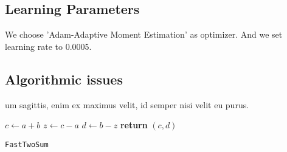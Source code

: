 \documentclass{article}
\begin{document}
\subsection{Learning Parameters}
 We  choose 'Adam-Adaptive Moment Estimation' as optimizer. And we set learning rate to 0.0005.
 
 


	

\subsection{Algorithmic issues}
um sagittis, enim ex maximus velit, id semper nisi velit eu purus.

\begin{center}
	\begin{minipage}{0.5\linewidth} %
		\begin{algorithm}[H]
			\medskip
			$c \leftarrow a + b$ \;
			$z \leftarrow c - a$ \;
			$d \leftarrow b - z$ \;
			{\bf return} $(c,d)$ \;
			\caption{\texttt{FastTwoSum}} %
			\label{alg:fastTwoSum}   %
		\end{algorithm}
	\end{minipage}
\end{center}




\begin{warn}[Notice:]
  
\end{warn}

\end{document}
